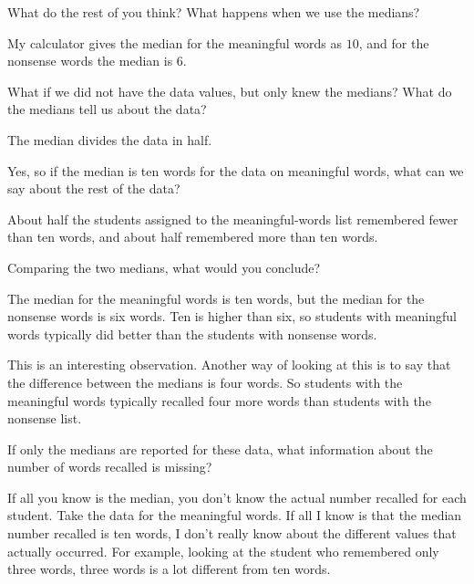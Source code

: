 {\begin{scriptlist}
      \item [Teacher:] What do the rest of you think? What happens when we use the medians?

      \item [Student D:] My calculator gives the median for the meaningful words as $10$, and for the nonsense words the median is $6$.

      \item [Teacher:] What if we did not have the data values, but only knew the medians? What do the medians tell us about the data?

      \item [Student D:] The median divides the data in half.

      \item [Teacher:] Yes, so if the median is ten words for the data on meaningful words, what can we say about the rest of the data?

      \item [Student F:] About half the students assigned to the meaningful-words list remembered fewer than ten words, and about half remembered more than ten words.

      \item [Teacher:] Comparing the two medians, what would you conclude?

      \item [Student F:] The median for the meaningful words is ten words, but the median for the nonsense words is six words. Ten is higher than six, so students with meaningful words typically did better than the students with nonsense words.

      \item [Teacher:] This is an interesting observation. Another way of looking at this is to say that the difference between the medians is four words. So students with the meaningful words typically recalled four more words than students with the nonsense list.

      \item [Teacher:] If only the medians are reported for these data, what information about the number of words recalled is missing?

      \item [Student G:] If all you know is the median, you don't know the actual number recalled for each student. Take the data for the meaningful words. If all I know is that the median number recalled is ten words, I don't really know about the different values that actually occurred. For example, looking at the student who remembered only three words, three words is a lot different from ten words.


\end{scriptlist}}
